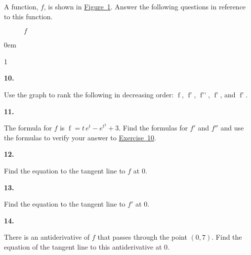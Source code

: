 \documentclass[12pt,]{book}
\theoremstyle{plain}
\theoremstyle{definition}
\numberwithin{equation}{section}
\newenvironment{exercisegroup}%
{\medskip\noindent}%
{\par\bigskip}%
\newlength{\exercisegroupindent}%
\newlength{\exercisegroupitemwidth}%
\newenvironment{exercisegrouplist}%
{\vspace{-\partopsep}%
\begin{adjustwidth}{\exercisegroupindent}{0em}}%
{\end{adjustwidth}%
\vspace{-\partopsep}%
\vspace{\baselineskip}}%
\newenvironment{exercisegroupbycol}[1]%
{\begin{exercisegrouplist}%
\vspace{-\multicolsep}%
\begin{multicols}{#1}%
\setlength{\parindent}{0em}%
\setlength{\exercisegroupitemwidth}{\linewidth}}%
{\end{multicols}%
\vspace{-\multicolsep}%
\end{exercisegrouplist}}%
\newenvironment{exercisegroupitem}[1]%
{\begin{minipage}[t]{\exercisegroupitemwidth}
\vspace{0pt}%
{\bfseries#1}%
\rule{0pt}{\baselineskip}}{\strut%
\end{minipage}%
\hspace{\columnsep}}%
\providecommand\phantomsection{}
\newcommand{\fe}[2]{\mathop{{#1}{\left(#2\right)}}}
\newcommand{\point}[2]{\left(#1,#2\right)}
\newcommand{\fd}[1]{#1'}
\newcommand{\sd}[1]{#1''}
\begin{document}
\begin{exercisegroup}%
A function, \(f\), is shown in \hyperref[figure-chain-rule-exercise]{Figure~\ref*{figure-chain-rule-exercise}}. Answer the following questions in reference to this function.%
\begin{figure}
\centering
{
}
\caption{\(f\)\label{figure-chain-rule-exercise}}
\end{figure}
\begin{exercisegroupbycol}{1}%
\begin{exercisegroupitem}{10. }\phantomsection\hypertarget{exerice-chain-rule-graph}{\null}
Use the graph to rank the following in decreasing order: \(\fe{f}{1}\), \(\fe{\fd{f}}{1}\), \(\fe{\sd{f}}{1}\), \(\fe{\fd{f}}{0}\), and \(\fe{\fd{f}}{-1}\).%
\end{exercisegroupitem}%
\par%
\begin{exercisegroupitem}{11. }\phantomsection\hypertarget{exercise-290}{\null}
The formula for \(f\) is \(\fe{f}{t}=t\,e^t-e^{t^2}+3\). Find the formulas for \(\fd{f}\) and \(\sd{f}\) and use the formulas to verify your answer to \hyperref[exerice-chain-rule-graph]{Exercise~10}.%
\end{exercisegroupitem}%
\par%
\begin{exercisegroupitem}{12. }\phantomsection\hypertarget{exercise-291}{\null}
Find the equation to the tangent line to \(f\) at \(0\).%
\end{exercisegroupitem}%
\par%
\begin{exercisegroupitem}{13. }\phantomsection\hypertarget{exercise-292}{\null}
Find the equation to the tangent line to \(\fd{f}\) at \(0\).%
\end{exercisegroupitem}%
\par%
\begin{exercisegroupitem}{14. }\phantomsection\hypertarget{exercise-293}{\null}
There is an antiderivative of \(f\) that passes through the point \(\point{0}{7}\). Find the equation of the tangent line to this antiderivative at \(0\).%
\end{exercisegroupitem}%
\par%
\end{exercisegroupbycol}%
\end{exercisegroup}%
\typeout{************************************************}
\typeout{************************************************}
\end{document}
